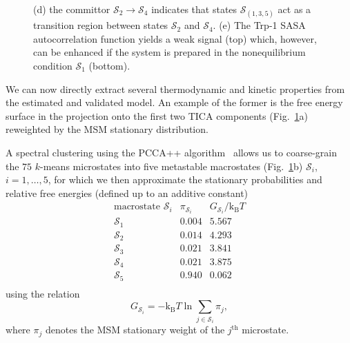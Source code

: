 \documentclass[9pt,tutorial]{livecoms}
\begin{document}
\begin{figure}
{(d) the committor $\mathcal{S}_2\to\mathcal{S}_4$ indicates that states $\mathcal{S}_{(1,3,5)}$ act as a transition region between states $\mathcal{S}_2$ and $\mathcal{S}_4$. 
(e) The Trp-1 SASA autocorrelation function yields a weak signal (top) which, however, can be enhanced if the system is prepared in the nonequilibrium condition $\mathcal{S}_1$ (bottom).}
\label{fig:msm-analysis}
\end{figure}

We can now directly extract several thermodynamic and kinetic properties from the estimated and validated model.
An example of the former is the free energy surface in the projection onto the first two TICA components (Fig.~\ref{fig:msm-analysis}a) reweighted by the MSM stationary distribution.

A spectral clustering using the PCCA++ algorithm~\cite{pcca++,Deuflhard2005-pcca,Kube2007-pcca+} allows us to coarse-grain the $75$ $k$-means microstates into five metastable macrostates (Fig.~\ref{fig:msm-analysis}b) $\mathcal{S}_i$, $i=1,\dots,5$, for which we then approximate the stationary probabilities and relative free energies (defined up to an additive constant)
\[ \begin{array}{ccc}
\textrm{macrostate } \mathcal{S}_i & \pi_{\mathcal{S}_i} & G_{\mathcal{S}_i} / \textrm{k}_\textrm{B} T \\
\hline
\mathcal{S}_1 & 0.004 & 5.567 \\
\mathcal{S}_2 & 0.014 & 4.293 \\
\mathcal{S}_3 & 0.021 & 3.841 \\
\mathcal{S}_4 & 0.021 & 3.875 \\
\mathcal{S}_5 & 0.940 & 0.062 \\
\end{array}\]
using the relation
\begin{equation}
\label{eq:fe}
G_{\mathcal{S}_i} = - \textrm{k}_\textrm{B} T \ln \sum\limits_{j\in \mathcal{S}_i} \pi_j,
\end{equation}
where $\pi_j$ denotes the MSM stationary weight of the $j^\textrm{th}$ microstate.
\end{document}
